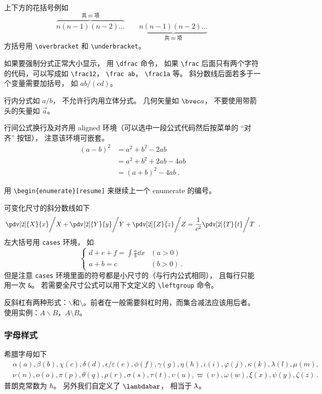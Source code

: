 上下方的花括号例如
\begin{equation}
\overbrace{n(n-1)(n-2)\dots}^{\text{共 $m$ 项}} \qquad \underbrace{n(n-1)(n-2)\dots}_{\text{共 $m$ 项}}~
\end{equation}
方括号用 \verb|\overbracket| 和 \verb|\underbracket|。

如果要强制分式正常大小显示， 用 \verb|\dfrac| 命令， 如果 \verb|\frac| 后面只有两个字符的代码，可以写成如 \verb|\frac12|， \verb|\frac ab|， \verb|\frac1a| 等。 斜分数线后面若多于一个变量需要加括号， 如 $ab/(cd)$。

行内分式如 $a/b$， 不允许行内用立体分式。 几何矢量如 $\bvec a$， 不要使用带箭头的矢量如 $\vec a$。 

行间公式换行及对齐用 aligned 环境（可以选中一段公式代码然后按菜单的 “对齐” 按钮）， 注意该环境可嵌套。
\begin{equation}
\begin{aligned}
(a-b)^2 &= a^2+b^2 - 2ab \\
& = a^2+b^2+2ab-4ab\\
& = (a+b)^2-4ab~.
\end{aligned}
\end{equation}

用 \verb|\begin{enumerate}[resume]|  来继续上一个 enumerate 的编号。

可变化尺寸的斜分数线如下
\begin{equation}
\left. \pdv[2]{X}{x} \middle/ X + \pdv[2]{Y}{y} \middle/ Y + \pdv[2]{Z}{z} \middle/ Z  = \frac{1}{c^2}  \pdv[2]{T}{t} \middle/ T\right.~.
\end{equation}
左大括号用 \verb|cases| 环境， 如
\begin{equation}
\begin{cases}
d+e+f = \int \frac{a}{b} \dd{x} &(a > 0)\\
a+b = c &(b > 0)~.
\end{cases}
\end{equation}
但是注意 \verb|cases| 环境里面的符号都是小尺寸的（与行内公式相同）， 且每行只能用一次 \verb|&|。 若需要全尺寸公式可以用下文定义的 \verb|\leftgroup| 命令。

反斜杠有两种形式：$\backslash$和$\setminus$。前者在一般需要斜杠时用，而集合减法应该用后者。使用实例：$A\backslash B$，$A\setminus B$。

\subsubsection{字母样式}
希腊字母如下
\begin{equation}
\begin{aligned}
&\alpha (a), \beta (b), \chi (c), \delta (d), \epsilon/\varepsilon (e), \phi (f), \gamma (g),
\eta (h), \iota (i), \varphi (j), \kappa (k), \lambda (l), \mu (m),\\
& \nu (n), o (o), \pi (p), \theta (q), \rho (r), \sigma (s), \tau (t), \upsilon (u), \varpi (v), \omega (w), \xi (x), \psi (y), \zeta (z)~.
\end{aligned}
\end{equation}
普朗克常数为 $\hbar$。 另外我们自定义了 $\lambdabar$， 相当于 $\mkern-0.25mu {\bar{\phantom{a}}} \mkern -10.2mu\lambda$。

